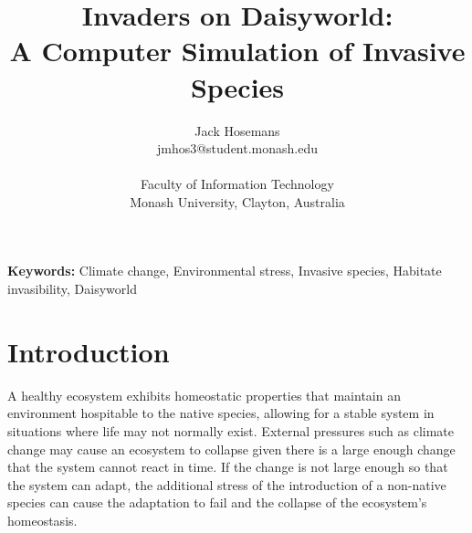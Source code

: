 \documentclass[12pt]{article}
\title{Invaders on Daisyworld:\\ A Computer Simulation of Invasive Species}
\author{
  Jack Hosemans\\
  \normalsize{jmhos3@student.monash.edu}\\
  \\
  \normalsize{Faculty of Information Technology}\\
  \normalsize{Monash University, Clayton, Australia}
}
\date{}
\makeatletter
\renewcommand\paragraph{\@startsection{paragraph}{4}{\z@}%
            {-2.5ex\@plus -1ex \@minus -.25ex}%
            {1.25ex \@plus .25ex}%
            {\normalfont\normalsize\bfseries}}
\newenvironment{sciabstract}{%
\begin{quote} \bf}
{\end{quote}}
\makeatother
\begin{document}
 

\baselineskip24pt


\maketitle 

{\bf \quad Keywords:} Climate change, Environmental stress, Invasive
species, Habitate invasibility, Daisyworld


\begin{sciabstract}

\end{sciabstract}




\section{Introduction}
A healthy ecosystem exhibits homeostatic properties\cite{morgan2001}
that maintain an environment hospitable to the native species,
allowing for a stable system in situations where life may not normally
exist. External pressures such as climate change may cause an
ecosystem to collapse given there is a large enough change that the
system cannot react in time\cite{barry2014}. If the change is not
large enough so that the system can adapt, the additional stress of the
introduction of a non-native species can cause the adaptation to fail
and the collapse of the ecosystem's homeostasis\cite{rapport1985}.
\end{document}
